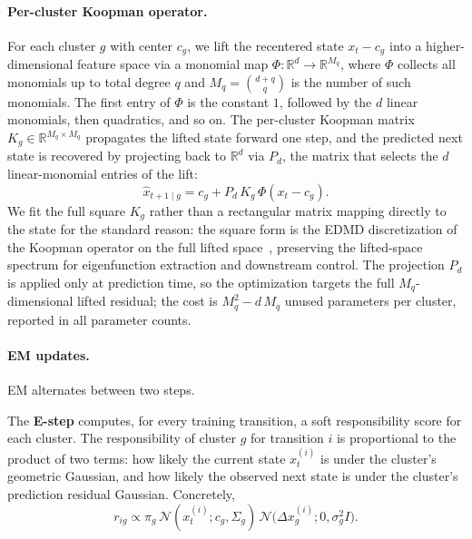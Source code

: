 \documentclass{article}
\begin{document}
\paragraph{Per-cluster Koopman operator.} For each cluster $g$ with center $c_g$, we lift the recentered state $x_t - c_g$ into a higher-dimensional feature space via a monomial map $\Phi: \mathbb{R}^d \to \mathbb{R}^{M_q}$, where $\Phi$ collects all monomials up to total degree $q$ and $M_q = \binom{d+q}{q}$ is the number of such monomials. The first entry of $\Phi$ is the constant $1$, followed by the $d$ linear monomials, then quadratics, and so on. The per-cluster Koopman matrix $K_g \in \mathbb{R}^{M_q \times M_q}$ propagates the lifted state forward one step, and the predicted next state is recovered by projecting back to $\mathbb{R}^d$ via $P_d$, the matrix that selects the $d$ linear-monomial entries of the lift:
\[
\hat{x}_{t+1\mid g} = c_g + P_d\, K_g\, \Phi(x_t - c_g).
\]
We fit the full square $K_g$ rather than a rectangular matrix mapping directly to the state for the standard reason: the square form is the EDMD discretization of the Koopman operator on the full lifted space~\citep{williams2015edmd,brunton2022modern}, preserving the lifted-space spectrum for eigenfunction extraction and downstream control. The projection $P_d$ is applied only at prediction time, so the optimization targets the full $M_q$-dimensional lifted residual; the cost is $M_q^2 - d\,M_q$ unused parameters per cluster, reported in all parameter counts.

\paragraph{EM updates.}\label{par:em-updates} EM alternates between two steps.

The \textbf{E-step} computes, for every training transition, a soft responsibility score for each cluster. The responsibility of cluster $g$ for transition $i$ is proportional to the product of two terms: how likely the current state $x_t^{(i)}$ is under the cluster's geometric Gaussian, and how likely the observed next state is under the cluster's prediction residual Gaussian. Concretely,
\[
r_{ig} \propto \pi_g\, \mathcal{N}(x_t^{(i)}; c_g, \Sigma_g)\, \mathcal{N}\!\bigl(\Delta x_g^{(i)}; 0, \sigma_g^2 I\bigr).
\]
\end{document}
